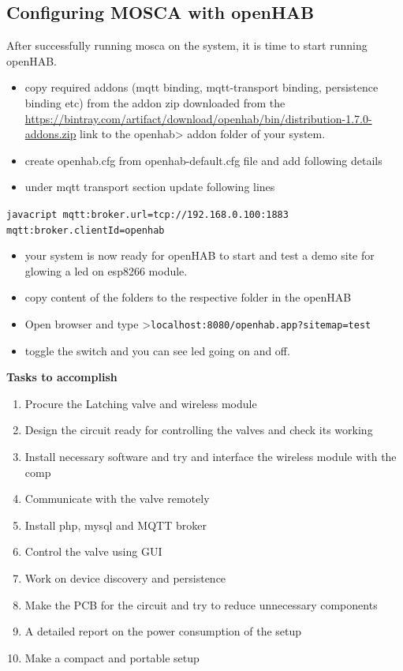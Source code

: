 \documentclass[16pt]{article}
\begin{document}
\subsection{Configuring MOSCA with
openHAB}



After successfully running mosca on the system, it is time to start
running openHAB.

\begin{itemize}

\item
  copy required addons (mqtt binding, mqtt-transport binding,
  persistence binding etc) from the addon zip downloaded from the
  \href{openHAB}{https://bintray.com/artifact/download/openhab/bin/distribution-1.7.0-addons.zip}
  link to the openhab\textgreater{} addon folder of your system.
\item
  create openhab.cfg from openhab-default.cfg file and add following
  details
\item
  under mqtt transport section update following lines
\end{itemize}

\texttt{javacript       mqtt:broker.url=tcp://192.168.0.100:1883       mqtt:broker.clientId=openhab}

\begin{itemize}


\item your system is now ready for openHAB to start and test a demo site for
glowing a led on esp8266 module.
\item copy content of the folders to the
respective folder in the openHAB 
\item Open browser and type
\textgreater{}\texttt{localhost:8080/openhab.app?sitemap=test}
\item toggle
the switch and you can see led going on and off.

\end{itemize}


\hfill

{\Large{\textbf{Tasks to accomplish}}}

\begin{enumerate}

\item
  Procure the Latching valve and wireless module
\item
  Design the circuit ready for controlling the valves and check its
  working
\item
  Install necessary software and try and interface the wireless module
  with the comp
\item
  Communicate with the valve remotely
\item
  Install php, mysql and MQTT broker
\item
  Control the valve using GUI
\item
  Work on device discovery and persistence
\item
  Make the PCB for the circuit and try to reduce unnecessary components
\item
  A detailed report on the power consumption of the setup
\item
  Make a compact and portable setup
\end{enumerate}
\end{document}
